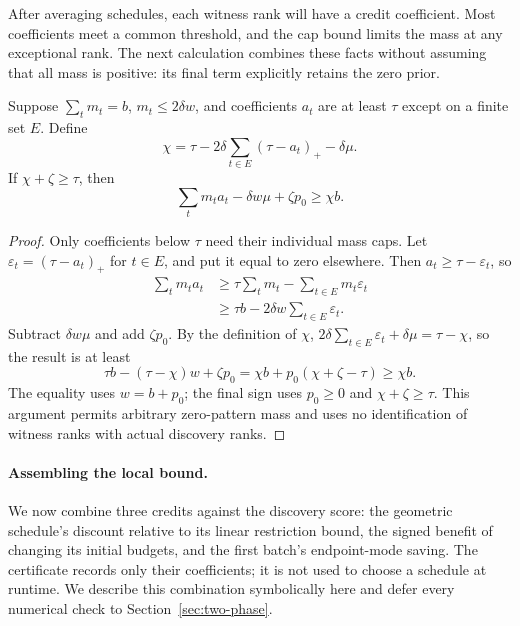 After averaging schedules, each witness rank will have a credit
coefficient. Most coefficients meet a common threshold, and the
cap bound limits the mass at any exceptional rank. The next
calculation combines these facts without assuming that all mass
is positive: its final term explicitly retains the zero prior.
\begin{claim}
\label{lem:capped-rank-credit}
Suppose $\sum_t m_t=b$, $m_t\le2\delta w$, and coefficients $a_t$
are at least $\tau$ except on a finite set $E$. Define
\[
 \chi=\tau-2\delta\sum_{t\in E}(\tau-a_t)_+-\delta\mu.
\]
If $\chi+\zeta\ge\tau$, then
\begin{equation}\label{eq:capped-rank-conversion}
 \sum_t m_t a_t-\delta w\mu+\zeta p_0\ge\chi b.
\end{equation}
\end{claim}
\begin{proof}
Only coefficients below $\tau$ need their individual mass caps.
Let $\varepsilon_t=(\tau-a_t)_+$ for $t\in E$, and put it equal
to zero elsewhere. Then $a_t\ge\tau-\varepsilon_t$, so
\[
 \begin{aligned}
 \sum_t m_ta_t
 &\ge\tau\sum_t m_t-\sum_{t\in E}m_t\varepsilon_t\\
 &\ge\tau b-2\delta w\sum_{t\in E}\varepsilon_t.
 \end{aligned}
\]
Subtract $\delta w\mu$ and add $\zeta p_0$. By the definition
of $\chi$, $2\delta\sum_{t\in E}\varepsilon_t+\delta\mu
=\tau-\chi$, so the result is at least
\[
 \tau b-(\tau-\chi)w+\zeta p_0
 =\chi b+p_0(\chi+\zeta-\tau)\ge\chi b.
\]
The equality uses $w=b+p_0$; the final sign uses
$p_0\ge0$ and $\chi+\zeta\ge\tau$.
This argument permits arbitrary zero-pattern mass and uses no
identification of witness ranks with actual discovery ranks.
\end{proof}

\paragraph{Assembling the local bound.}
We now combine three credits against the discovery score: the
geometric schedule's discount relative to its linear restriction
bound, the signed benefit of changing its initial budgets, and
the first batch's endpoint-mode saving. The certificate records
only their coefficients; it is not used to choose a schedule at
runtime. We describe this combination symbolically here and
defer every numerical check to Section~\ref{sec:two-phase}.

